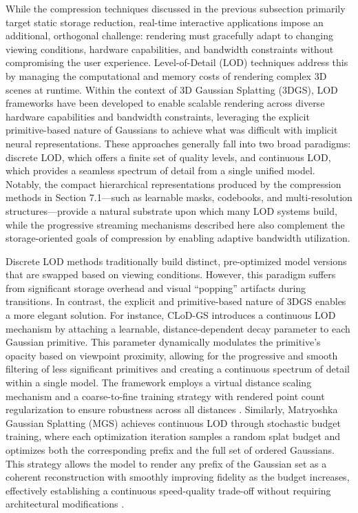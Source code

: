 \documentclass[11pt]{article}
\begin{document}
While the compression techniques discussed in the previous subsection primarily target static storage reduction, real-time interactive applications impose an additional, orthogonal challenge: rendering must gracefully adapt to changing viewing conditions, hardware capabilities, and bandwidth constraints without compromising the user experience. Level-of-Detail (LOD) techniques address this by managing the computational and memory costs of rendering complex 3D scenes at runtime. Within the context of 3D Gaussian Splatting (3DGS), LOD frameworks have been developed to enable scalable rendering across diverse hardware capabilities and bandwidth constraints, leveraging the explicit primitive-based nature of Gaussians to achieve what was difficult with implicit neural representations. These approaches generally fall into two broad paradigms: discrete LOD, which offers a finite set of quality levels, and continuous LOD, which provides a seamless spectrum of detail from a single unified model. Notably, the compact hierarchical representations produced by the compression methods in Section 7.1---such as learnable masks, codebooks, and multi-resolution structures---provide a natural substrate upon which many LOD systems build, while the progressive streaming mechanisms described here also complement the storage-oriented goals of compression by enabling adaptive bandwidth utilization.

Discrete LOD methods traditionally build distinct, pre-optimized model versions that are swapped based on viewing conditions. However, this paradigm suffers from significant storage overhead and visual ``popping'' artifacts during transitions. In contrast, the explicit and primitive-based nature of 3DGS enables a more elegant solution. For instance, CLoD-GS introduces a continuous LOD mechanism by attaching a learnable, distance-dependent decay parameter to each Gaussian primitive. This parameter dynamically modulates the primitive's opacity based on viewpoint proximity, allowing for the progressive and smooth filtering of less significant primitives and creating a continuous spectrum of detail within a single model. The framework employs a virtual distance scaling mechanism and a coarse-to-fine training strategy with rendered point count regularization to ensure robustness across all distances \cite{ref452}. Similarly, Matryoshka Gaussian Splatting (MGS) achieves continuous LOD through stochastic budget training, where each optimization iteration samples a random splat budget and optimizes both the corresponding prefix and the full set of ordered Gaussians. This strategy allows the model to render any prefix of the Gaussian set as a coherent reconstruction with smoothly improving fidelity as the budget increases, effectively establishing a continuous speed-quality trade-off without requiring architectural modifications \cite{ref453}.
\end{document}
